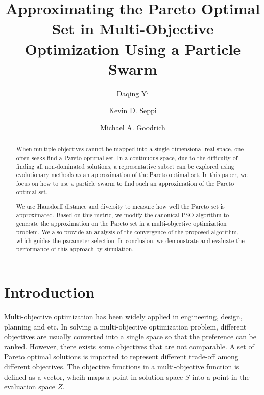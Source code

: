 \documentclass[12pt]{article}
\begin{document}
\title{\textsf{Approximating the Pareto Optimal Set in Multi-Objective Optimization Using a Particle Swarm}}

\author{
\textsf{Daqing Yi}
\and
\textsf{Kevin D. Seppi}
\and
\textsf{Michael A. Goodrich}
}

\date{}
\maketitle

\begin{abstract}
When multiple objectives cannot be mapped into a single dimensional real space, one often seeks find a Pareto optimal set. In a continuous space, due to the difficulty of finding all non-dominated solutions, a representative subset can be explored using evolutionary methods as an approximation of the Pareto optimal set. In this paper, we focus on how to use a particle swarm to find such an approximation of the Pareto optimal set.

We use Hausdorff distance and diversity to measure how well the Pareto set is approximated. Based on this metric, we modify the canonical PSO algorithm to generate the approximation on the Pareto set in a multi-objective optimization problem. We also provide an analysis  of the convergence of the proposed algorithm, which guides the parameter selection. In conclusion, we demonstrate and evaluate the performance of this approach by simulation.
\end{abstract}

\section{Introduction}
Multi-objective optimization has been widely applied in engineering, design, planning and etc. 
In solving a multi-objective optimization problem, different objectives are usually converted into a single space so that the preference can be ranked.
However, there exists some objectives that are not comparable.
A set of Pareto optimal solutions is imported to represent different trade-off among different objectives.
The objective functions in a multi-objective function is defined as a vector, whcih maps a point in solution space $ S $ into a point in the evaluation space $ Z $.
\end{document}

